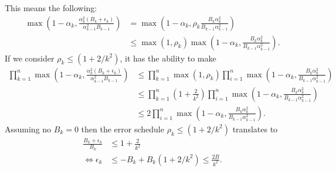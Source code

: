 \documentclass[12pt]{article}
\begin{document}
    This means the following: 
    \begin{align*}
        \max\left(
            1 - \alpha_k, 
            \frac{\alpha_k^2(B_k + \epsilon_k)}{\alpha_{k - 1}^2B_{k - 1}}
        \right)
        &=
        \max\left(
            1 - \alpha_k, 
            \rho_k\frac{B_k\alpha_k^2}{B_{k - 1}\alpha_{k - 1}^2}
        \right)
        \\
        &\le \max(1, \rho_k)\max\left(
            1 - \alpha_k, 
            \frac{B_k\alpha_k^2}{B_{k - 1}\alpha_{k - 1}^2}
        \right). 
    \end{align*}
    If we consider $\rho_k \le (1 + 2/k^2)$, it has the ability to make
    \begin{align*}
        \prod_{k = 1}^{n} 
        \max \left(
            1 - \alpha_k, 
            \frac{\alpha_k^2(B_k + \epsilon_k)}{\alpha_{k - 1}^2B_{k - 1}}
        \right)
        &\le 
        \prod_{k = 1}^{n} 
        \max(1, \rho_k)
        \prod_{i = 1}^{n}
        \max\left(
            1 - \alpha_k, 
            \frac{B_k\alpha_k^2}{B_{k - 1}\alpha_{k - 1}^2}
        \right)
        \\
        &\le \prod_{k = 1}^n
        \left(
            1 + \frac{2}{k^2}
        \right)
        \prod_{i = 1}^{n}
        \max\left(
            1 - \alpha_k, 
            \frac{B_k\alpha_k^2}{B_{k - 1}\alpha_{k - 1}^2}
        \right)
        \\
        &\le 2 
        \prod_{i = 1}^{n}\max\left(
            1 - \alpha_k, 
            \frac{B_k\alpha_k^2}{B_{k - 1}\alpha_{k - 1}^2}
        \right). 
    \end{align*}
    Assuming no $B_k = 0$ then the error schedule $\rho_k \le (1 + 2/k^2)$ translates to 
    \begin{align*}
        \frac{B_k + \epsilon_k}{B_k} &\le 1 + \frac{2}{k^2}
        \\
        \iff 
        \epsilon_k &\le - B_k + B_k(1 + 2/k^2) \le \frac{2B}{k^2}. 
    \end{align*}
\end{document}
